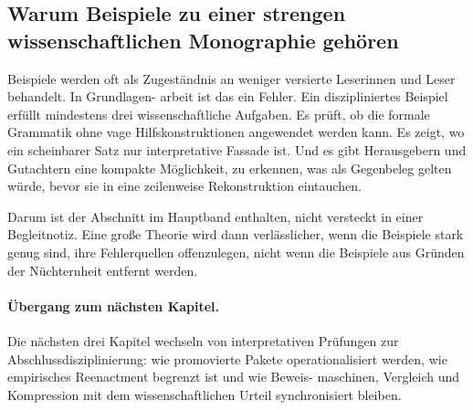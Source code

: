 \subsection{Warum Beispiele zu einer strengen wissenschaftlichen Monographie gehören}

Beispiele werden oft als Zugeständnis an weniger versierte Leserinnen und Leser behandelt. In Grundlagen-
arbeit ist das ein Fehler. Ein diszipliniertes Beispiel erfüllt mindestens drei wissenschaftliche Aufgaben.
Es prüft, ob die formale Grammatik ohne vage Hilfskonstruktionen angewendet werden kann. Es zeigt, wo ein
scheinbarer Satz nur interpretative Fassade ist. Und es gibt Herausgebern und Gutachtern eine kompakte
Möglichkeit, zu erkennen, was als Gegenbeleg gelten würde, bevor sie in eine zeilenweise Rekonstruktion
eintauchen.

Darum ist der Abschnitt im Hauptband enthalten, nicht versteckt in einer Begleitnotiz. Eine große Theorie wird
dann verlässlicher, wenn die Beispiele stark genug sind, ihre Fehlerquellen offenzulegen, nicht wenn die
Beispiele aus Gründen der Nüchternheit entfernt werden.

\paragraph{Übergang zum nächsten Kapitel.}
Die nächsten drei Kapitel wechseln von interpretativen Prüfungen zur Abschlussdisziplinierung: wie
promovierte Pakete operationalisiert werden, wie empirisches Reenactment begrenzt ist und wie Beweis-
maschinen, Vergleich und Kompression mit dem wissenschaftlichen Urteil synchronisiert bleiben.

\clearpage
